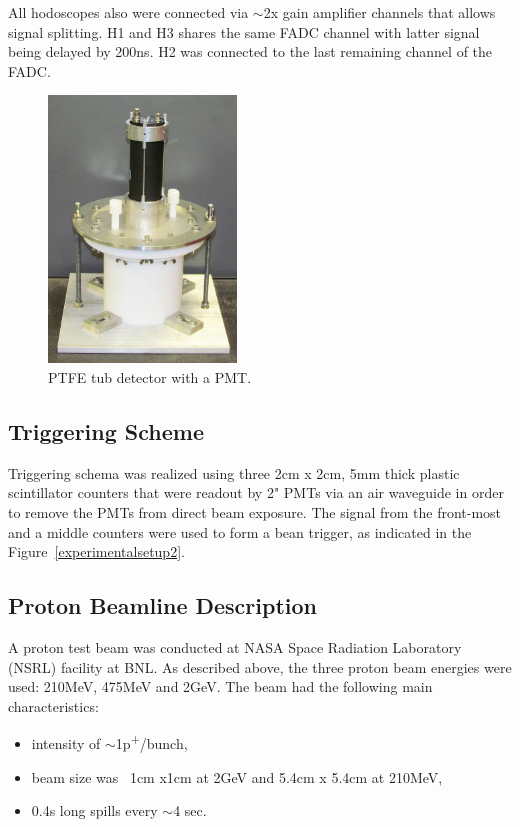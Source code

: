 \documentclass[preprint,12pt]{elsarticle}
\begin{document}
All hodoscopes also were connected via $\sim$2x gain amplifier channels that allows signal splitting. H1 and H3 shares the same FADC channel with latter signal being delayed by 200ns. H2 was connected to the last remaining channel of the FADC.





\begin{figure}[ht]
\centering
\includegraphics[width=50mm]{figure1_tub.jpg}
\caption{PTFE tub detector with a PMT.} \label{whitetubpicture}
\end{figure}

\subsection{Triggering Scheme}
\label{trigs}
Triggering schema was realized using three 2cm x 2cm, 5mm thick plastic scintillator counters that were readout by 2" PMTs via an air waveguide in order to remove the PMTs from direct beam exposure. The signal from the front-most and a middle counters were used to form a bean trigger, as indicated in the Figure~\ref{experimentalsetup2}.




\subsection{Proton Beamline Description}
\label{pbeamsection}
A proton test beam was conducted at NASA Space Radiation Laboratory (NSRL) facility at BNL. As described above, the three proton beam energies were used:
210MeV, 475MeV and 2GeV. The beam had the following main characteristics:

\begin{itemize}
	\item intensity of $\sim$1p\textsuperscript{+}/bunch,
	\item beam size was ~1cm x1cm at 2GeV and 5.4cm x 5.4cm at 210MeV,
	\item 0.4s long spills every $\sim$4 sec.
\end{itemize}
\end{document}
